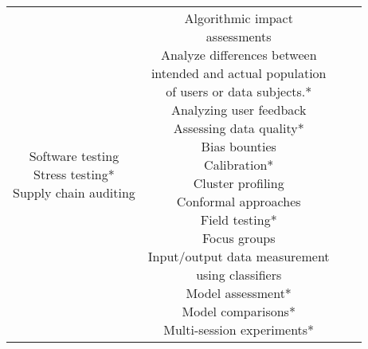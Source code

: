 \documentclass[fleqn]{article}
\begin{document}
\begin{table}[H]
\begin{tabular}{|c|c|c|c|}
{			\textbullet\hspace{3pt} Software testing\\ 	
			\textbullet\hspace{3pt} Stress testing*\\ 	
			\textbullet\hspace{3pt} Supply chain auditing \\
		} 
		& \makecell[l]{
			\textbullet\hspace{3pt} Algorithmic impact\\\hspace{10pt}assessments\\ 	
			\textbullet\hspace{3pt} Analyze differences between\\\hspace{10pt}intended and actual population\\\hspace{10pt}of users or data subjects.*\\		
			\textbullet\hspace{3pt} Analyzing user feedback\\ 	
			\textbullet\hspace{3pt} Assessing data quality*\\ 		
			\textbullet\hspace{3pt} Bias bounties\\ 	
			\textbullet\hspace{3pt} Calibration*\\ 	
			\textbullet\hspace{3pt} Cluster profiling\\ 	
			\textbullet\hspace{3pt} Conformal approaches\\ 	
			\textbullet\hspace{3pt} Field testing*\\ 	
			\textbullet\hspace{3pt} Focus groups\\ 	
			\textbullet\hspace{3pt} Input/output data measurement\\\hspace{10pt}using classifiers\\ 	
			\textbullet\hspace{3pt} Model assessment*\\ 	
			\textbullet\hspace{3pt} Model comparisons*\\ 	
			\textbullet\hspace{3pt} Multi-session experiments*\\ 	
}
\end{tabular}
\end{table}
\end{document}
